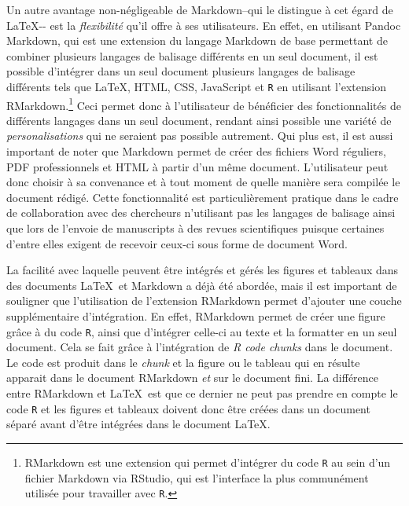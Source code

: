 \documentclass[
  letterpaper,
  DIV=11,
  numbers=noendperiod]{scrreprt}
\begin{document}
Un autre avantage non-négligeable de Markdown--qui le distingue à cet
égard de \LaTeX-\/- est la \emph{flexibilité} qu'il offre à ses
utilisateurs. En effet, en utilisant Pandoc Markdown, qui est une
extension du langage Markdown de base permettant de combiner plusieurs
langages de balisage différents en un seul document, il est possible
d'intégrer dans un seul document plusieurs langages de balisage
différents tels que \LaTeX, HTML, CSS, JavaScript et \texttt{R} en
utilisant l'extension RMarkdown.\footnote{RMarkdown est une extension
  qui permet d'intégrer du code \texttt{R} au sein d'un fichier Markdown
  via RStudio, qui est l'interface la plus communément utilisée pour
  travailler avec \texttt{R}.} Ceci permet donc à l'utilisateur de
bénéficier des fonctionnalités de différents langages dans un seul
document, rendant ainsi possible une variété de \emph{personalisations}
qui ne seraient pas possible autrement. Qui plus est, il est aussi
important de noter que Markdown permet de créer des fichiers Word
réguliers, PDF professionnels et HTML à partir d'un même document.
L'utilisateur peut donc choisir à sa convenance et à tout moment de
quelle manière sera compilée le document rédigé. Cette fonctionnalité
est particulièrement pratique dans le cadre de collaboration avec des
chercheurs n'utilisant pas les langages de balisage ainsi que lors de
l'envoie de manuscripts à des revues scientifiques puisque certaines
d'entre elles exigent de recevoir ceux-ci sous forme de document Word.

La facilité avec laquelle peuvent être intégrés et gérés les figures et
tableaux dans des documents \LaTeX~et Markdown a déjà été abordée, mais
il est important de souligner que l'utilisation de l'extension RMarkdown
permet d'ajouter une couche supplémentaire d'intégration. En effet,
RMarkdown permet de créer une figure grâce à du code \texttt{R}, ainsi
que d'intégrer celle-ci au texte et la formatter en un seul document.
Cela se fait grâce à l'intégration de \emph{R code chunks} dans le
document. Le code est produit dans le \emph{chunk} et la figure ou le
tableau qui en résulte apparait dans le document RMarkdown \emph{et} sur
le document fini. La différence entre RMarkdown et \LaTeX~est que ce
dernier ne peut pas prendre en compte le code \texttt{R} et les figures
et tableaux doivent donc être créées dans un document séparé avant
d'être intégrées dans le document \LaTeX.
\end{document}
